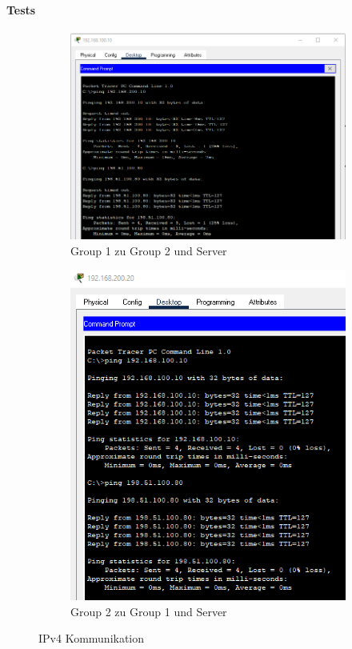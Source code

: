 \paragraph{Tests}
\begin{figure}[!htb]
    \centering
    \begin{subfigure}{.49\textwidth}
        \includegraphics[width=\textwidth,height=.85\textwidth,keepaspectratio]{./img/config/test1.png}
        \caption{Group 1 zu Group 2 und Server}
    \end{subfigure}
    \begin{subfigure}{.49\textwidth}
        \includegraphics[width=\textwidth,height=.85\textwidth,keepaspectratio]{./img/config/test2.png}
        \caption{Group 2 zu Group 1 und Server}
    \end{subfigure}
    \caption{IPv4 Kommunikation}
\end{figure}

